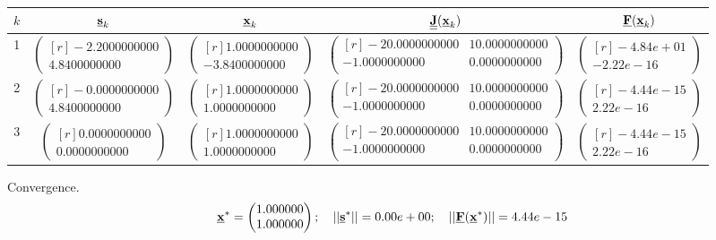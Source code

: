 \documentclass{report}[10pts]
\begin{document}
\begin{center}\begin{tabular}{|c|c|c|c|c|}
\hline
$k$ & $\underline{\mathbf{s}}_k$ & $\underline{\mathbf{x}}_k$ & $\underline{\underline{{\mathbf{J}}}}(\underline{\mathbf{x}}_k)$ & $\underline{\mathbf{F}}(\underline{\mathbf{x}}_k)$\\
\hline
1 & $
\begin{pmatrix*}[r]
-2.2000000000 \\ 4.8400000000
\end{pmatrix*}
$ & $
\begin{pmatrix*}[r]
1.0000000000 \\ -3.8400000000
\end{pmatrix*}
$ & $
\begin{pmatrix*}[r]
   -20.0000000000 & 10.0000000000\\
   -1.0000000000 & 0.0000000000\\
\end{pmatrix*}
$ & $
\begin{pmatrix*}[r]
-4.84e+01 \\ -2.22e-16
\end{pmatrix*}
$\\
\hline
2 & $
\begin{pmatrix*}[r]
-0.0000000000 \\ 4.8400000000
\end{pmatrix*}
$ & $
\begin{pmatrix*}[r]
1.0000000000 \\ 1.0000000000
\end{pmatrix*}
$ & $
\begin{pmatrix*}[r]
   -20.0000000000 & 10.0000000000\\
   -1.0000000000 & 0.0000000000\\
\end{pmatrix*}
$ & $
\begin{pmatrix*}[r]
-4.44e-15 \\ 2.22e-16
\end{pmatrix*}
$\\
\hline
3 & $
\begin{pmatrix*}[r]
0.0000000000 \\ 0.0000000000
\end{pmatrix*}
$ & $
\begin{pmatrix*}[r]
1.0000000000 \\ 1.0000000000
\end{pmatrix*}
$ & $
\begin{pmatrix*}[r]
   -20.0000000000 & 10.0000000000\\
   -1.0000000000 & 0.0000000000\\
\end{pmatrix*}
$ & $
\begin{pmatrix*}[r]
-4.44e-15 \\ 2.22e-16
\end{pmatrix*}
$\\
\hline
\end{tabular}\end{center}

Convergence.
\[
   \Vector{x}^*=
      \begin{pmatrix*}[r]
      1.000000 \\ 1.000000
      \end{pmatrix*}
   ;\quad
   ||\Vector{s}^*||=
   0.00e+00
   ;\quad
   ||\Vector{F}(\Vector{x}^*)||=
   4.44e-15
\]
\clearpage



\end{document}
